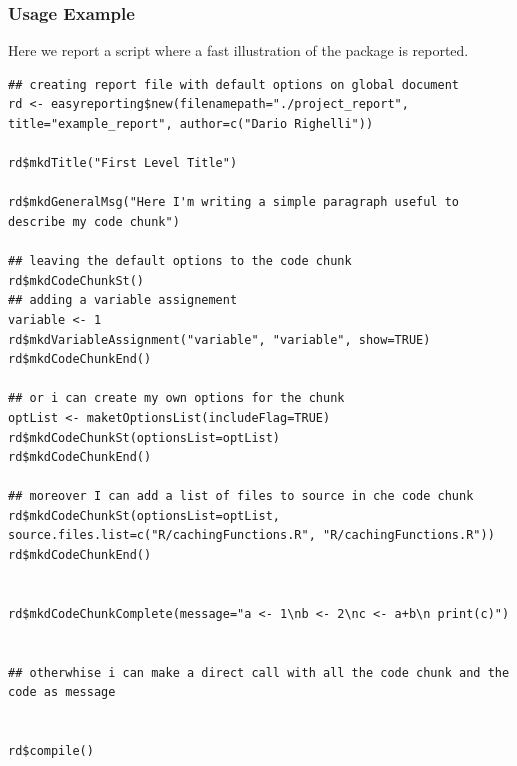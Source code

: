 \subsubsection{Usage Example}
Here we report a script where a fast illustration of the package is reported.
%

\begin{lstlisting}
## creating report file with default options on global document
rd <- easyreporting$new(filenamepath="./project_report", title="example_report", author=c("Dario Righelli"))

rd$mkdTitle("First Level Title")

rd$mkdGeneralMsg("Here I'm writing a simple paragraph useful to describe my code chunk")

## leaving the default options to the code chunk
rd$mkdCodeChunkSt()
## adding a variable assignement
variable <- 1
rd$mkdVariableAssignment("variable", "variable", show=TRUE)
rd$mkdCodeChunkEnd()

## or i can create my own options for the chunk
optList <- maketOptionsList(includeFlag=TRUE)
rd$mkdCodeChunkSt(optionsList=optList)
rd$mkdCodeChunkEnd()

## moreover I can add a list of files to source in che code chunk
rd$mkdCodeChunkSt(optionsList=optList, source.files.list=c("R/cachingFunctions.R", "R/cachingFunctions.R"))
rd$mkdCodeChunkEnd()


rd$mkdCodeChunkComplete(message="a <- 1\nb <- 2\nc <- a+b\n print(c)")


## otherwhise i can make a direct call with all the code chunk and the code as message


rd$compile()


\end{lstlisting}
 
